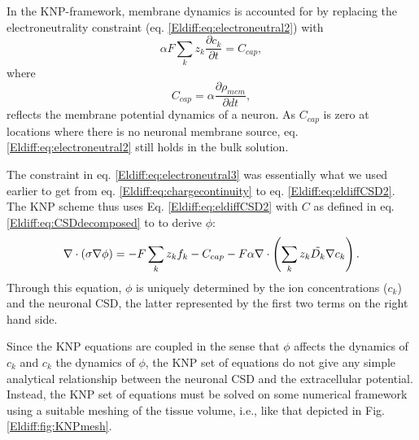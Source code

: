 In the KNP-framework, membrane dynamics is accounted for by replacing the electroneutrality constraint (eq. \ref{Eldiff:eq:electroneutral2}) with
\begin{equation}
\alpha F \sum_k{z_k \frac{\partial c_k}{\partial t}} = C_{cap},
\label{Eldiff:eq:electroneutral3}
\end{equation}
where 
\begin{equation}
C_{cap} = {\alpha}\frac{\partial \rho_{mem}}{\partial dt},
\label{Eldiff:eq:Andreas}
\end{equation}
reflects the membrane potential dynamics of a neuron. As $C_{cap}$ is zero at locations where there is no neuronal membrane source, eq. \ref{Eldiff:eq:electroneutral2} still holds in the bulk solution. 

The constraint in eq. \ref{Eldiff:eq:electroneutral3} was essentially what we used earlier to get from eq. \ref{Eldiff:eq:chargecontinuity} to eq. \ref{Eldiff:eq:eldiffCSD2}. The KNP scheme thus uses Eq. \ref{Eldiff:eq:eldiffCSD2} with $C$ as defined in eq.  \ref{Eldiff:eq:CSDdecomposed} to to derive $\phi$:
\begin{equation}
\nabla \cdot (\sigma\nabla\phi) = - F \sum_k z_k f_k -  C_{cap} - F\alpha \nabla \cdot \left (\sum_k{z_k \tilde{D_k}{\bf \nabla} c_{k}} \right).
\label{Eldiff:eq:KNPfinal}
\end{equation}
Through this equation, $\phi$ is uniquely determined by the ion concentrations ($c_k$) and the neuronal CSD, the latter represented by the first two terms on the right hand side.

Since the KNP equations are coupled in the sense that $\phi$ affects the dynamics of $c_k$ and $c_k$ the dynamics of $\phi$, the KNP set of equations do not give any simple analytical relationship between the neuronal CSD and the extracellular potential. Instead, the KNP set of equations must be solved on some numerical framework using a suitable meshing of the tissue volume, i.e., like that depicted in Fig. \ref{Eldiff:fig:KNPmesh}.

